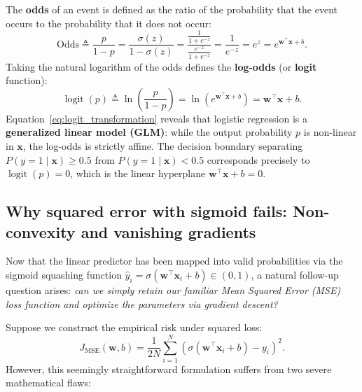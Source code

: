 The \textbf{odds} of an event is defined as the ratio of the probability that the event occurs to the probability that it does not occur:
\begin{equation}
\text{Odds} \triangleq \frac{p}{1 - p} = \frac{\sigma(z)}{1 - \sigma(z)} = \frac{\frac{1}{1 + e^{-z}}}{\frac{e^{-z}}{1 + e^{-z}}} = \frac{1}{e^{-z}} = e^z = e^{\mathbf{w}^\top \mathbf{x} + b}.
\label{eq:odds_ratio}
\end{equation}
Taking the natural logarithm of the odds defines the \textbf{log-odds} (or \textbf{logit} function):
\begin{equation}
\operatorname{logit}(p) \triangleq \ln\left( \frac{p}{1 - p} \right) = \ln\left( e^{\mathbf{w}^\top \mathbf{x} + b} \right) = \mathbf{w}^\top \mathbf{x} + b.
\label{eq:logit_transformation}
\end{equation}
Equation~\eqref{eq:logit_transformation} reveals that logistic regression is a \textbf{generalized linear model (GLM)}: while the output probability $p$ is non-linear in $\mathbf{x}$, the log-odds is strictly affine. The decision boundary separating $P(y=1 \mid \mathbf{x}) \ge 0.5$ from $P(y=1 \mid \mathbf{x}) < 0.5$ corresponds precisely to $\operatorname{logit}(p) = 0$, which is the linear hyperplane $\mathbf{w}^\top \mathbf{x} + b = 0$.

\subsection{Why squared error with sigmoid fails: Non-convexity and vanishing gradients}
\label{sec:squared_error_sigmoid_failure}

Now that the linear predictor has been mapped into valid probabilities via the sigmoid squashing function $\hat{y}_i = \sigma(\mathbf{w}^\top \mathbf{x}_i + b) \in (0, 1)$, a natural follow-up question arises: \textit{can we simply retain our familiar Mean Squared Error (MSE) loss function and optimize the parameters via gradient descent?}

Suppose we construct the empirical risk under squared loss:
\begin{equation}
J_{\text{MSE}}(\mathbf{w}, b) = \frac{1}{2N} \sum_{i=1}^N \left( \sigma(\mathbf{w}^\top \mathbf{x}_i + b) - y_i \right)^2.
\label{eq:mse_sigmoid_objective}
\end{equation}
However, this seemingly straightforward formulation suffers from two severe mathematical flaws:

